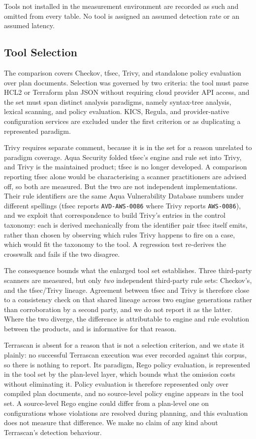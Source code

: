 \documentclass[smallextended]{svjour3}
\begin{document}
Tools not installed in the measurement environment are recorded as such and
omitted from every table. No tool is assigned an assumed detection rate or an
assumed latency.

\subsection{Tool Selection}
\label{sec:toolsel}
The comparison covers Checkov, tfsec, Trivy, and standalone policy evaluation
over plan documents. Selection was governed by two criteria: the tool must parse
HCL2 or Terraform plan JSON without requiring cloud provider API access, and the
set must span distinct analysis paradigms, namely syntax-tree analysis, lexical
scanning, and policy evaluation. KICS, Regula, and provider-native configuration
services are excluded under the first criterion or as duplicating a represented
paradigm.

Trivy requires separate comment, because it is in the set for a reason unrelated
to paradigm coverage. Aqua Security folded tfsec's engine and rule set into
Trivy, and Trivy is the maintained product; tfsec is no longer developed. A
comparison reporting tfsec alone would be characterising a scanner practitioners
are advised off, so both are measured. But the two are not independent
implementations. Their rule identifiers are the same Aqua Vulnerability Database
numbers under different spellings (tfsec reports \texttt{AVD-AWS-0086} where
Trivy reports \texttt{AWS-0086}), and we exploit that correspondence to build
Trivy's entries in the control taxonomy: each is derived mechanically from the
identifier pair tfsec itself emits, rather than chosen by observing which rules
Trivy happens to fire on a case, which would fit the taxonomy to the tool. A
regression test re-derives the crosswalk and fails if the two disagree.

The consequence bounds what the enlarged tool set establishes. Three third-party
scanners are measured, but only \emph{two} independent third-party rule sets:
Checkov's, and the tfsec/Trivy lineage. Agreement between tfsec and Trivy is
therefore close to a consistency check on that shared lineage across two engine
generations rather than corroboration by a second party, and we do not report it
as the latter. Where the two diverge, the difference is attributable to engine and
rule evolution between the products, and is informative for that reason.

Terrascan is absent for a reason that is not a selection criterion, and we state
it plainly: no successful Terrascan execution was ever recorded against this
corpus, so there is nothing to report. Its paradigm, Rego policy evaluation, is
represented in the tool set by the plan-level layer, which bounds what the
omission costs without eliminating it. Policy evaluation is therefore represented
only over compiled plan documents, and no source-level policy engine appears in
the tool set. A source-level Rego engine could differ from a plan-level one on
configurations whose violations are resolved during planning, and this evaluation
does not measure that difference. We make no claim of any kind about Terrascan's
detection behaviour.
\end{document}
